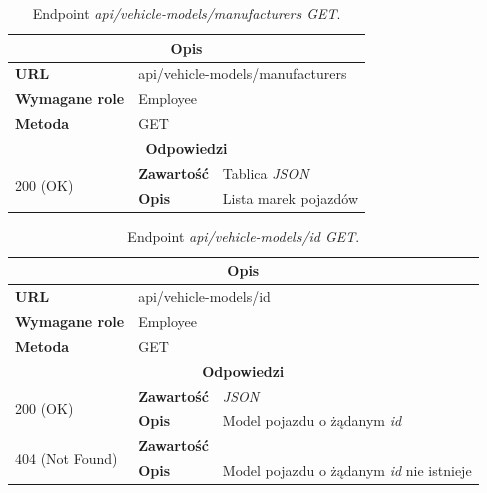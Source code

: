 \documentclass[eng,printmode,openany]{mgr}
\begin{document}
\begin{table}[H]
	\caption{Endpoint \textit{api/vehicle-models/manufacturers GET}.}
	\begin{tabularx}{\textwidth}{|l|l|X|}
		\hline
		\multicolumn{3}{|c|}{\textbf{\textbf{Opis}}}
		
		\\ \hline
		\textbf{URL}                         & \multicolumn{2}{l|}{api/vehicle-models/manufacturers}
		\\ \hline
		\textbf{Wymagane role}               & \multicolumn{2}{l|}{Employee}
		\\ \hline
		\textbf{Metoda}                      & \multicolumn{2}{l|}{GET}
		\\ \hline
		\multicolumn{3}{|c|}{\textbf{Odpowiedzi}}
		\\ \hline
		\multirow{2}{*}{200 (OK)}   & \textbf{Zawartość}        & Tablica \textit{JSON}
		\\ \cline{2-3}              & \textbf{Opis}         	   & Lista marek pojazdów
		\\ \hline
	\end{tabularx}
\end{table}

\begin{table}[H]
	\caption{Endpoint \textit{api/vehicle-models/id GET}.}
	\begin{tabularx}{\textwidth}{|l|l|X|}
		\hline
		\multicolumn{3}{|c|}{\textbf{\textbf{Opis}}}
		\\ \hline
		\textbf{URL}                         & \multicolumn{2}{l|}{api/vehicle-models/id}
		\\ \hline
		\textbf{Wymagane role}               & \multicolumn{2}{l|}{Employee}
		\\ \hline
		\textbf{Metoda}                      & \multicolumn{2}{l|}{GET}
		\\ \hline
		\multicolumn{3}{|c|}{\textbf{Odpowiedzi}}
		\\ \hline
		\multirow{2}{*}{200 (OK)} 	        & \textbf{Zawartość}   	& \textit{JSON}
		\\ \cline{2-3}                      & \textbf{Opis}         	& Model pojazdu o żądanym \textit{id}
		\\ \hline
		\multirow{2}{*}{404 (Not Found)} 	& \textbf{Zawartość}     & 
		\\ \cline{2-3}                      & \textbf{Opis}          & Model pojazdu o żądanym \textit{id} nie istnieje
		\\ \hline
	\end{tabularx}
\end{table}
\end{document}

